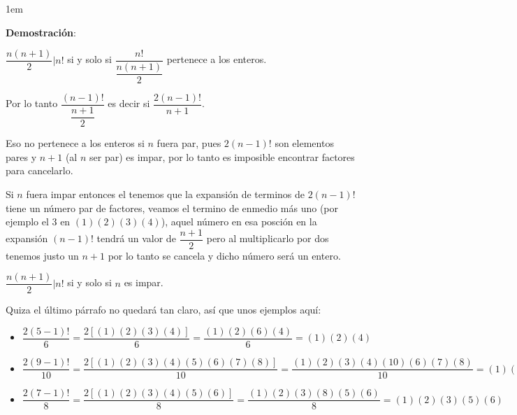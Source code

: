 \documentclass[12pt, fleqn]{article}                             %
\newenvironment{SmallIndentation}[1][0.75em]                    %
    {\begin{adjustwidth}{#1}{}\begin{footnotesize}}                 %
    {\end{footnotesize}\end{adjustwidth}}                           %
\begin{document}
        \begin{SmallIndentation}[1em]
            \textbf{Demostración}:

            $\dfrac{n(n+1)}{2} | n!$ si y solo si $\dfrac{n!}{\dfrac{n(n+1)}{2}}$
            pertenece a los enteros.

            Por lo tanto $\dfrac{(n-1)!}{\dfrac{n+1}{2}}$ es decir
            si $\dfrac{2(n-1)!}{n+1}$.

            Eso no pertenece a los enteros si $n$ fuera par, pues $2(n-1)!$ son elementos
            pares y $n+1$ (al $n$ ser par) es impar, por lo tanto es imposible encontrar
            factores para cancelarlo.

            Si $n$ fuera impar entonces el tenemos que la expansión de terminos de
            $2(n-1)!$ tiene un número par de factores, veamos el termino de enmedio más
            uno (por ejemplo el 3 en $(1)(2)(3)(4)$), aquel número en esa posción en la 
            expansión $(n-1)!$ tendrá un valor de $\dfrac{n+1}{2}$ pero al multiplicarlo
            por dos tenemos justo un $n+1$ por lo tanto se cancela y dicho número será
            un entero.

            $\dfrac{n(n+1)}{2} | n! $ si y solo si $n$ es impar.

            Quiza el último párrafo no quedará tan claro, así que unos ejemplos aquí:

            \begin{itemize}
                \item 
                    $\dfrac{2(5-1)!}{6} 
                        = \dfrac{2[(1)(2)(3)(4)]}{6} 
                        = \dfrac{(1)(2)(6)(4)}{6}
                        = (1)(2)(4)$

                \item 
                    $\dfrac{2(9-1)!}{10} 
                        = \dfrac{2[(1)(2)(3)(4)(5)(6)(7)(8)]}{10} 
                        = \dfrac{(1)(2)(3)(4)(10)(6)(7)(8)}{10} 
                        = (1)(2)(3)(4)(6)(7)(8)$

                \item 
                    $\dfrac{2(7-1)!}{8} 
                        = \dfrac{2[(1)(2)(3)(4)(5)(6)]}{8} 
                        = \dfrac{(1)(2)(3)(8)(5)(6)}{8} 
                        = (1)(2)(3)(5)(6)$ 
            \end{itemize}

        \end{SmallIndentation}
\end{document}
